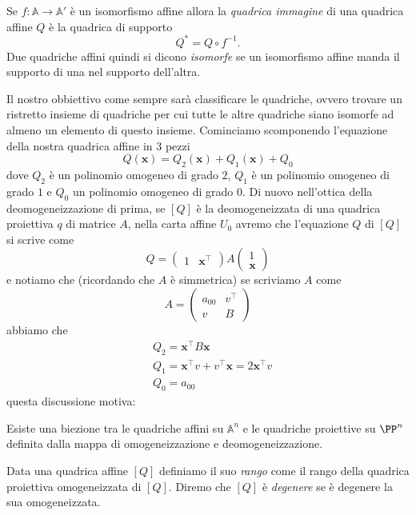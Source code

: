 \documentclass[11pt]{scrartcl}
\renewcommand{\AA}{\mathbb{A}}
\begin{document}
	\begin{definition}
		Se $f:\AA\to\AA'$ è un isomorfismo affine allora la \textit{quadrica immagine} di una quadrica affine $Q$ è la quadrica di supporto
		$$Q^*=Q\circ f^{-1}.$$
		Due quadriche affini quindi si dicono \textit{isomorfe} se un isomorfismo affine manda il supporto di una nel supporto dell'altra.
	\end{definition}
	Il nostro obbiettivo come sempre sarà classificare le quadriche, ovvero trovare un ristretto insieme di quadriche per cui tutte le altre quadriche siano isomorfe ad almeno un elemento di questo insieme. Cominciamo scomponendo l'equazione della nostra quadrica affine in $3$ pezzi
	$$Q(\mathbf{x})=Q_2(\mathbf{x})+Q_1(\mathbf{x})+Q_0$$
	dove $Q_2$ è un polinomio omogeneo di grado $2$, $Q_1$ è un polinomio omogeneo di grado $1$ e $Q_0$ un polinomio omogeneo di grado $0$. Di nuovo nell'ottica della deomogeneizzazione di prima, se $[Q]$ è la deomogeneizzata di una quadrica proiettiva $q$ di matrice $A$, nella carta affine $U_0$ avremo che l'equazione $Q$ di $[Q]$ si scrive come
	$$Q=
	\left(
	\begin{array}{c|c}
		1 & \mathbf{x}^\intercal
	\end{array}
	\right)A\left(
	\begin{array}{c}
		1 \\
		\hline 
		\mathbf{x}
	\end{array}
	\right)
	$$
	e notiamo che (ricordando che $A$ è simmetrica) se scriviamo $A$ come
	$$
	A=
	\left(
	\begin{array}{c|c}
		a_{00} & v^\intercal \\
		\hline
		v & B
	\end{array}
	\right)
	$$
	abbiamo che 
	\begin{align*}
		& Q_2=\mathbf{x}^\intercal B \mathbf{x} \\
		& Q_1 =\mathbf{x}^\intercal v + v^\intercal \mathbf{x}= 2\mathbf{x}^\intercal v \\
		& Q_0 = a_{00}
	\end{align*}
	questa discussione motiva:
	\begin{proposition}
		Esiste una biezione tra le quadriche affini su $\AA^n$ e le quadriche proiettive su $\PP^n$ definita dalla mappa di omogeneizzazione e deomogeneizzazione.
	\end{proposition}
	\begin{definition}
		Data una quadrica affine $[Q]$ definiamo il suo \textit{rango} come il rango della quadrica proiettiva omogeneizzata di $[Q]$. Diremo che $[Q]$ è \textit{degenere} se è degenere la sua omogeneizzata.
	\end{definition}
\end{document}
